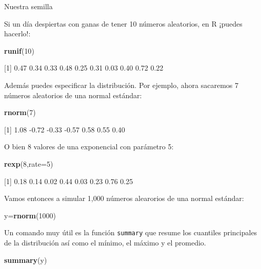 \documentclass[
]{book}
\newenvironment{Shaded}{\begin{snugshade}}{\end{snugshade}}
\newcommand{\DataTypeTok}[1]{\textcolor[rgb]{0.13,0.29,0.53}{#1}}
\newcommand{\DecValTok}[1]{\textcolor[rgb]{0.00,0.00,0.81}{#1}}
\newcommand{\KeywordTok}[1]{\textcolor[rgb]{0.13,0.29,0.53}{\textbf{#1}}}
\newcommand{\NormalTok}[1]{#1}
\begin{document}
Nuestra semilla

Si un día despiertas con ganas de tener 10 números aleatorios, en R ¡puedes hacerlo!:

\begin{Shaded}
\begin{Highlighting}[]
\KeywordTok{runif}\NormalTok{(}\DecValTok{10}\NormalTok{)}
\end{Highlighting}
\end{Shaded}

{[}1{]} 0.47 0.34 0.33 0.48 0.25 0.31 0.03 0.40 0.72 0.22

Además puedes especificar la distribución. Por ejemplo, ahora sacaremos 7 números aleatorios de una normal estándar:

\begin{Shaded}
\begin{Highlighting}[]
\KeywordTok{rnorm}\NormalTok{(}\DecValTok{7}\NormalTok{)}
\end{Highlighting}
\end{Shaded}

{[}1{]} 1.08 -0.72 -0.33 -0.57 0.58 0.55 0.40

O bien 8 valores de una exponencial con parámetro 5:

\begin{Shaded}
\begin{Highlighting}[]
\KeywordTok{rexp}\NormalTok{(}\DecValTok{8}\NormalTok{,}\DataTypeTok{rate=}\DecValTok{5}\NormalTok{)}
\end{Highlighting}
\end{Shaded}

{[}1{]} 0.18 0.14 0.02 0.44 0.03 0.23 0.76 0.25

Vamos entonces a simular 1,000 números alearorios de una normal estándar:

\begin{Shaded}
\begin{Highlighting}[]
\NormalTok{y=}\KeywordTok{rnorm}\NormalTok{(}\DecValTok{1000}\NormalTok{)}
\end{Highlighting}
\end{Shaded}

Un comando muy útil es la función \texttt{summary} que resume los cuantiles principales de la distribución así como el mínimo, el máximo y el promedio.

\begin{Shaded}
\begin{Highlighting}[]
\KeywordTok{summary}\NormalTok{(y)}
\end{Highlighting}
\end{Shaded}
\end{document}
